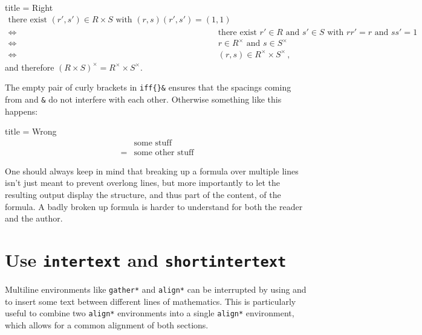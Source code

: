 \documentclass[a4paper, 10pt, headings=standardclasses, oneside, bibliography=totocnumbered]{scrbook}
\begin{document}
\begin{itemize}
\begin{tcblisting}{title = {Right}}
\begin{align*}
  \text{there exist $(r', s') \in R \times S$ with $(r,s)(r',s') = (1,1)$}
  \\
  \iff{}&
  \text{there exist $r' \in R$ and $s' \in S$ with $rr' = r$ and $ss' = 1$}
  \\
  \iff{}&
  \text{$r \in R^\times$ and $s \in S^\times$}
  \\
  \iff{}&
  (r,s) \in R^\times \times S^\times \,,
\end{align*}
and therefore $(R \times S)^{\times} = R^\times \times S^\times$.
    \end{tcblisting}
    The empty pair of curly brackets in \texttt{{\tbs}iff\{\}\&} ensures that the spacings coming from  and \texttt{\&} do not interfere with each other.
    Otherwise something like this happens:
    \begin{tcblisting}{title = {Wrong}}
      \begin{align*}
         &\text{some stuff} \\
        =&\text{some other stuff}
      \end{align*}
    \end{tcblisting}
\end{itemize}

One should always keep in mind that breaking up a formula over multiple lines isn’t just meant to prevent overlong lines, but more importantly to let the resulting output display the structure, and thus part of the content, of the formula.
A badly broken up formula is harder to understand for both the reader and the author.






\section{Use \texttt{intertext} and \texttt{shortintertext}}

Multiline environments like \texttt{gather*} and \texttt{align*} can be interrupted by using  and  to insert some text between different lines of mathematics.
This is particularly useful to combine two \texttt{align*} environments into a single \texttt{align*} environment, which allows for a common alignment of both sections.
\end{document}
